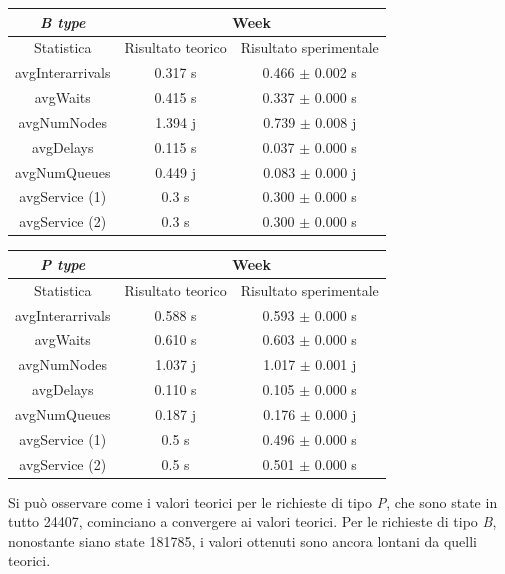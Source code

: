 \documentclass[a4paper, 12pt]{article}
\begin{document}
\begin{table}[H]
\centering
\begin{tabular}{ |c|c|c| }
\hline
\cellcolor{cellcolor} \textit{B type} & \multicolumn{2}{|c|}{\cellcolor{cellcolor}Week} \\
\hline
\cellcolor{cellcolor}Statistica & \cellcolor{cellcolor}Risultato teorico & \cellcolor{cellcolor}Risultato sperimentale \\
\hline
\hline
avgInterarrivals & 0.317 s & 0.466 $\pm$ 0.002 s \\
\hline
avgWaits & 0.415 s & 0.337 $\pm$ 0.000 s \\
\hline
avgNumNodes & 1.394 j & 0.739 $\pm$ 0.008 j \\
\hline
avgDelays & 0.115 s & 0.037 $\pm$ 0.000 s \\
\hline
avgNumQueues & 0.449 j & 0.083 $\pm$ 0.000 j \\
\hline
avgService (1) & 0.3 s & 0.300 $\pm$ 0.000 s \\
\hline
avgService (2) & 0.3 s & 0.300 $\pm$ 0.000 s \\
\hline
\end{tabular}
\end{table}
\bigskip

\begin{table}[H]
\centering
\begin{tabular}{ |c|c|c| }
\hline
\cellcolor{cellcolor} \textit{P type} & \multicolumn{2}{|c|}{\cellcolor{cellcolor}Week} \\
\hline
\cellcolor{cellcolor}Statistica & \cellcolor{cellcolor}Risultato teorico & \cellcolor{cellcolor}Risultato sperimentale \\
\hline
\hline
avgInterarrivals & 0.588 s & 0.593 $\pm$ 0.000 s \\
\hline
avgWaits & 0.610 s & 0.603 $\pm$ 0.000 s \\
\hline
avgNumNodes & 1.037 j & 1.017 $\pm$ 0.001 j \\
\hline
avgDelays & 0.110 s & 0.105 $\pm$ 0.000 s \\
\hline
avgNumQueues & 0.187 j & 0.176 $\pm$ 0.000 j \\
\hline
avgService (1) & 0.5 s & 0.496 $\pm$ 0.000 s \\
\hline
avgService (2) & 0.5 s & 0.501 $\pm$ 0.000 s \\
\hline
\end{tabular}
\end{table}
\bigskip

Si può osservare come i valori teorici per le richieste di tipo \textit{P}, che sono state in tutto 24407, cominciano a convergere ai valori teorici. Per le richieste di tipo \textit{B}, nonostante siano state 181785, i valori ottenuti sono ancora lontani da quelli teorici.\\
\end{document}
